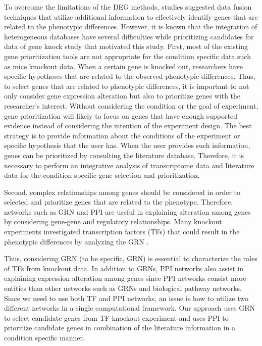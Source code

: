 \documentclass[oneside,phd]{snuthesis}
\begin{document}
To overcome the limitations of the DEG methods, studies suggested data fusion techniques that utilize additional information to effectively identify genes that are related to the phenotypic differences. 
However, it is known that the integration of heterogeneous databases have several difficulties while prioritizing candidates for data of gene knock study that motivated this study.
First, most of the existing gene prioritization tools are not appropriate for the condition specific data such as mice knockout data. 
When a certain gene is knocked out, researchers have specific hypotheses that are related to the observed phenotypic differences. 
Thus, to select genes that are related to phenotypic differences, it is important
to not only consider gene expression alteration but also to prioritize genes with the researcher’s interest. 
Without considering the condition or the goal of experiment, gene prioritization will likely to focus on genes that have enough supported evidence instead of considering the intention of the experiment design.
The best strategy is to provide information about the conditions of the experiment or specific hypothesis that the user has. 
When the user provides such information, genes can be prioritized by consulting the literature database. 
Therefore, it is necessary to perform an integrative analysis of transcriptome data and literature data for the condition specific gene selection and prioritization.

Second, complex relationships among genes should be considered in order to selected and prioritize genes that are related to the phenotype. 
Therefore, networks such as GRN and PPI are useful in explaining alteration among genes by considering gene-gene and regulatory relationships.
Many knockout experiments investigated transcription factors (TFs) that could result in
the phenotypic differences by analyzing the GRN \citep{geier2007reconstructing, madhamshettiwar2012gene, wang2012inference, ud2015optimal}.

Thus, considering GRN (to be specific, GRN) is essential to characterize the roles of TFs from knockout data. 
In addition to GRNs, PPI networks also assist in explaining expression alteration among genes since PPI networks consist more entities than other networks such as GRNs and biological pathway networks. 
Since we need to use both TF and PPI networks, an issue is how to utilize two different networks in a single computational framework. Our approach uses GRN to select candidate genes from TF knockout experiment and uses PPI to prioritize candidate genes in combination of the literature information in a condition specific manner.
\end{document}
